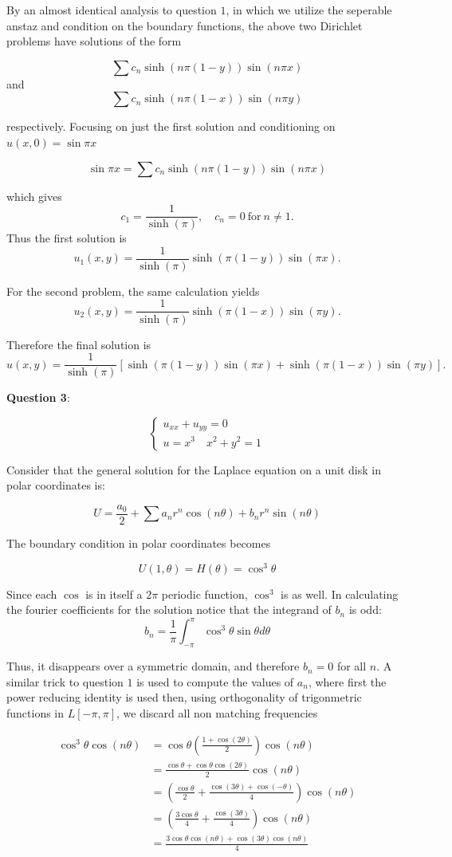 \documentclass{article} %
\newcommand{\question}[2][]{
  \begin{flushleft}
    \textbf{Question #1}: \textit{#2}

\end{flushleft}}
\begin{document}
By an almost identical analysis to question $1$, in which we utilize
the seperable anstaz and condition on the boundary functions, the above two
Dirichlet problems have solutions of the form

$$
\sum c_n\sinh(n\pi(1-y))\sin(n\pi x)
$$
and
$$
\sum c_n\sinh(n\pi(1-x))\sin(n\pi y)
$$

respectively. Focusing on just the first solution and conditioning on
$u(x,0) = \sin \pi x$

$$
\sin \pi x = \sum c_n\sinh(n\pi(1-y))\sin(n\pi x)
$$

which gives
\[
  c_1 = \frac{1}{\sinh(\pi)},\quad c_n = 0\ \text{for}\ n \ne 1.
\]
Thus the first solution is
\[
  u_1(x,y) = \frac{1}{\sinh(\pi)}\sinh(\pi(1-y))\sin(\pi x).
\]

For the second problem, the same calculation yields
\[
  u_2(x,y) = \frac{1}{\sinh(\pi)}\sinh(\pi(1-x))\sin(\pi y).
\]

Therefore the final solution is
\[
  u(x,y) = \frac{1}{\sinh(\pi)}\left[\sinh(\pi(1-y))\sin(\pi x)
  + \sinh(\pi(1-x))\sin(\pi y)\right].
\]
\question[3]{}
\[
  \begin{cases}
    u_{xx} + u_{yy} = 0 \\
    u = x^3 \quad x^2 + y^2 = 1
  \end{cases}
\]

Consider that the general solution for the Laplace equation on a unit disk
in polar coordinates is:

\[
  U = \frac{a_0}{2} + \sum a_n r^n \cos(n\theta) + b_n r^n\sin(n\theta)
\]

The boundary condition in polar coordinates becomes

\[
  U(1, \theta) = H(\theta)  = \cos^3\theta
\]

Since each $\cos$ is in itself a $2\pi$ periodic function, $\cos^3$
is as well. In calculating the fourier coefficients for the solution notice that
the integrand of $b_n$ is odd:
$$
b_n = \frac{1}{\pi}\int_{-\pi}^\pi \cos^3\theta\sin\theta d\theta
$$

Thus, it disappears over a symmetric domain, and therefore $b_n = 0$
for all $n$. A similar trick to question $1$ is used to compute the
values of $a_n$, where first the power reducing identity is used
then, using orthogonality of trigonmetric functions in $L[-\pi,\pi]$,
we discard all non matching frequencies

\[
  \begin{aligned}
    \cos^3\theta \cos(n\theta)
    &= \cos\theta\left(\frac{1+\cos(2\theta)}{2}\right)\cos(n\theta) \\
    &= \frac{\cos\theta+\cos\theta\cos(2\theta)}{2}\cos(n\theta) \\
    &=
    \left(\frac{\cos\theta}{2}+\frac{\cos(3\theta)+\cos(-\theta)}{4}\right)\cos(n\theta)
    \\
    &=
    \left(\frac{3\cos\theta}{4}+\frac{\cos(3\theta)}{4}\right)\cos(n\theta) \\
    &= \frac{3\cos\theta\cos(n\theta)+\cos(3\theta)\cos(n\theta)}{4}
  \end{aligned}
\]
\end{document}
